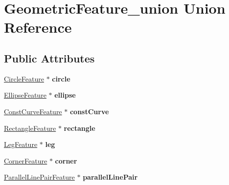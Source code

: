 \hypertarget{unionGeometricFeature__union}{\section{\-Geometric\-Feature\-\_\-union \-Union \-Reference}
\label{unionGeometricFeature__union}
}
\subsection*{\-Public \-Attributes}
\begin{DoxyCompactItemize}
\item 
\hypertarget{unionGeometricFeature__union_a7b409522fc217ba0b354b36da85608cc}{\hyperlink{structCircleFeature__struct}{\-Circle\-Feature} $\ast$ {\bfseries circle}}\label{unionGeometricFeature__union_a7b409522fc217ba0b354b36da85608cc}

\item 
\hypertarget{unionGeometricFeature__union_aeb13857f88933f516a01736af5c92f0c}{\hyperlink{structEllipseFeature__struct}{\-Ellipse\-Feature} $\ast$ {\bfseries ellipse}}\label{unionGeometricFeature__union_aeb13857f88933f516a01736af5c92f0c}

\item 
\hypertarget{unionGeometricFeature__union_a04dc7f093427b1726f45e884d0bd8cd8}{\hyperlink{structConstCurveFeature__struct}{\-Const\-Curve\-Feature} $\ast$ {\bfseries const\-Curve}}\label{unionGeometricFeature__union_a04dc7f093427b1726f45e884d0bd8cd8}

\item 
\hypertarget{unionGeometricFeature__union_a318cf9cf8acc86b912cf1aaae63ff995}{\hyperlink{structRectangleFeature__struct}{\-Rectangle\-Feature} $\ast$ {\bfseries rectangle}}\label{unionGeometricFeature__union_a318cf9cf8acc86b912cf1aaae63ff995}

\item 
\hypertarget{unionGeometricFeature__union_a91d7f78a623fca92170f96a0c516837c}{\hyperlink{structLegFeature__struct}{\-Leg\-Feature} $\ast$ {\bfseries leg}}\label{unionGeometricFeature__union_a91d7f78a623fca92170f96a0c516837c}

\item 
\hypertarget{unionGeometricFeature__union_a44bd117e2ac1fad760964828939e9755}{\hyperlink{structCornerFeature__struct}{\-Corner\-Feature} $\ast$ {\bfseries corner}}\label{unionGeometricFeature__union_a44bd117e2ac1fad760964828939e9755}

\item 
\hypertarget{unionGeometricFeature__union_a972965ccf25813be69d8c37572f3ddf6}{\hyperlink{structParallelLinePairFeature__struct}{\-Parallel\-Line\-Pair\-Feature} $\ast$ {\bfseries parallel\-Line\-Pair}}\label{unionGeometricFeature__union_a972965ccf25813be69d8c37572f3ddf6}


\end{DoxyCompactItemize}
